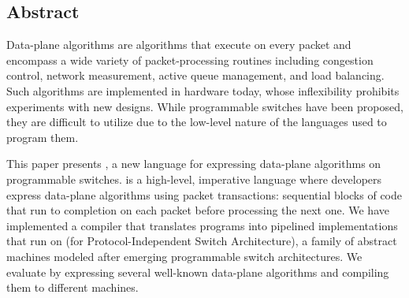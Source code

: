 \subsection*{Abstract}
Data-plane algorithms are algorithms that execute on every packet and encompass
a wide variety of packet-processing routines including congestion control,
network measurement, active queue management, and load balancing. Such 
algorithms are implemented in hardware today, whose inflexibility prohibits
experiments with new designs. While programmable switches have been proposed, 
they are difficult to utilize due to the low-level nature of the languages
used to program them.

This paper presents \pktlanguage, a new language for expressing data-plane
algorithms on programmable switches. \pktlanguage is a high-level, imperative
language where developers express data-plane algorithms using packet
transactions: sequential blocks of code that run to completion on each packet
before processing the next one. We have implemented a compiler that translates
\pktlanguage programs into pipelined implementations that run on \absmachine
(for Protocol-Independent Switch Architecture), a family of abstract machines
modeled after emerging programmable switch architectures. We evaluate
\pktlanguage by expressing several well-known data-plane algorithms and
compiling them to different \absmachine machines.
